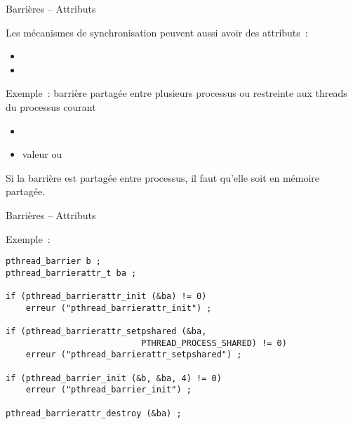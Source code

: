 \begin {frame} {Barrières -- Attributs}

    Les mécanismes de synchronisation peuvent aussi avoir des
    attributs~:

    \begin {itemize}
	\item {}

	\item {}

    \end {itemize}

    Exemple~: barrière partagée entre plusieurs processus ou restreinte
    aux threads du processus courant

    \begin {itemize}
	\item 
		 \\

	\item valeur  ou

    \end {itemize}

    Si la barrière est partagée entre processus, il faut qu'elle soit
    en mémoire partagée.

\end {frame}

\begin {frame} [fragile] {Barrières -- Attributs}

Exemple~:

\small
\begin {lstlisting}
pthread_barrier b ;
pthread_barrierattr_t ba ;

if (pthread_barrierattr_init (&ba) != 0)
    erreur ("pthread_barrierattr_init") ;

if (pthread_barrierattr_setpshared (&ba,
                           PTHREAD_PROCESS_SHARED) != 0)
    erreur ("pthread_barrierattr_setpshared") ;

if (pthread_barrier_init (&b, &ba, 4) != 0)
    erreur ("pthread_barrier_init") ;

pthread_barrierattr_destroy (&ba) ;
\end{lstlisting}

\end{frame}
